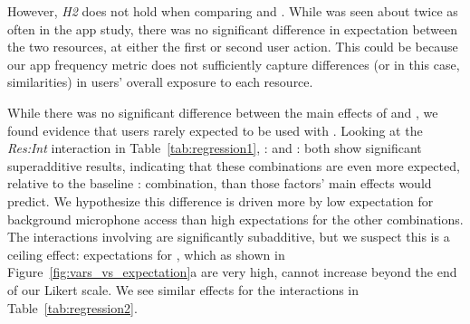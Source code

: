 However, \emph{H2} does not hold when comparing \contacts{} and \mic{}. While 
\textit{\contacts{}} was seen about twice as often in the app study, there was no 
significant difference in expectation between the two resources, at either the first or second user action. 
This could be because our app frequency metric does not sufficiently capture differences (or in this case, 
similarities) in users' overall exposure to each resource.

While there was no significant difference between the main effects of \contacts{} and \mic{}, 
we found evidence that users rarely expected \mic{} to be used with 
\backgroundonly{}. Looking at the \textit{Res:Int} interaction in Table~\ref{tab:regression1}, 
\location{}:\backgroundnotify{} and \contacts{}:\backgroundnotify{} both show significant 
superadditive results, indicating that these combinations are even more expected, relative to 
the baseline \mic{}:\backgroundonly{} combination, than those factors' main effects would predict. 
We hypothesize this difference is driven more by low expectation for background microphone 
access than high expectations for the other combinations. 
The interactions involving \interactive{} are significantly 
subadditive, but we suspect this is a ceiling effect: expectations for \interactive{}, 
which as shown in Figure~\ref{fig:vars_vs_expectation}a are very high, cannot increase beyond the end of our Likert scale. We see similar effects for the \interactive{} interactions in Table~\ref{tab:regression2}.  



